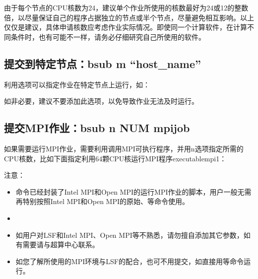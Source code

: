 \documentclass[a4paper,12pt,english]{sphinxmanual}
\begin{document}
\sphinxAtStartPar
由于每个节点的CPU核数为24，建议单个作业所使用的核数最好为24或12的整数倍，以尽量保证自己的程序占据独立的节点或半个节点，尽量避免相互影响。以上仅仅是建议，具体申请核数应考虑作业实际情况。即使同一个计算软件，在计算不同条件时，也有可能不一样，请务必仔细研究自己所使用的软件。


\subsection{提交到特定节点：bsub \sphinxhyphen{}m “host\_name”}
\label{\detokenize{lsf/lsf:bsub-m-host-name}}
\sphinxAtStartPar
利用选项可以指定作业在特定节点上运行，如：

\sphinxAtStartPar
{}

\sphinxAtStartPar
如非必要，建议不要添加此选项，以免导致作业无法及时运行。


\subsection{提交MPI作业：bsub \sphinxhyphen{}n NUM mpijob}
\label{\detokenize{lsf/lsf:mpi-bsub-n-num-mpijob}}
\sphinxAtStartPar
如果需要运行MPI作业，需要利用调用MPI可执行程序，并用\sphinxhyphen{}n选项指定所需的CPU核数，比如下面指定利用64颗CPU核运行MPI程序executable\sphinxhyphen{}mpi1：

\sphinxAtStartPar
{}

\sphinxAtStartPar
注意：
\begin{itemize}
\item {} 
\sphinxAtStartPar
{}命令已经封装了Intel MPI和Open
MPI的运行MPI作业的脚本，用户一般无需再特别按照Intel MPI和Open
MPI的原始、等命令使用。

\item {} 

\item {} 
\sphinxAtStartPar
如用户对LSF和Intel MPI、Open
MPI等不熟悉，请勿擅自添加其它参数，如有需要请与超算中心联系。

\item {} 
\sphinxAtStartPar
如您了解所使用的MPI环境与LSF的配合，也可不用提交，如直接用等命令运行。

\end{itemize}
\end{document}
